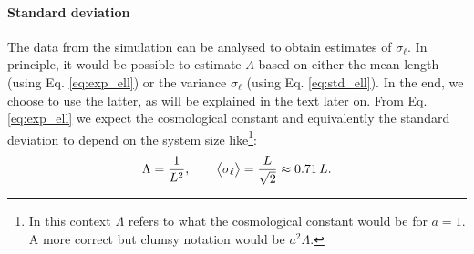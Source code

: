 \paragraph{Standard deviation}
The data from the simulation can be analysed to obtain estimates of $\sigma_\ell$. In principle, it would be possible to estimate $\Lambda$ based on either the mean length (using Eq. \eqref{eq:exp_ell}) or the variance $\sigma_\ell$ (using Eq. \eqref{eq:std_ell}). In the end, we choose to use the latter, as will be explained in the text later on.
From Eq. \eqref{eq:exp_ell} we expect the cosmological constant and equivalently the standard deviation to depend on the system size like\footnote{In this context $\Lambda$ refers to what the cosmological constant would be for $a = 1$. A more correct but clumsy notation would be $a^2 \Lambda$.}:
\begin{equation}\label{eq:std_theory}
    \Lambda = \frac{1}{L^2}, \qquad \big\langle \sigma_\ell \big\rangle = \frac{L}{\sqrt{2}} \approx 0.71 \, L.
\end{equation}

